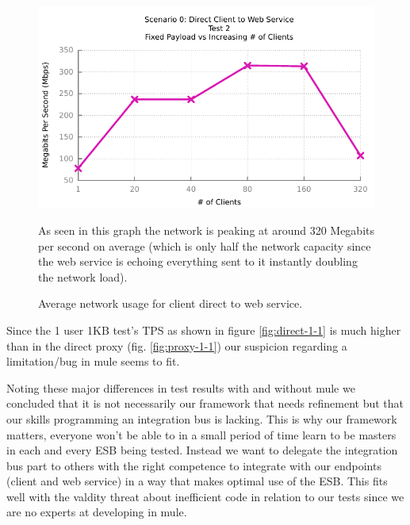 \begin{figure}
	\caption{Average network usage for client direct to web service.}
	\centerline{\includegraphics{img/direct_fp_iu_kbs}}
	\label{fig:direct-2-3}
	As seen in this graph the network is peaking at around 320 Megabits per second on average (which is only half the network capacity since the web service is echoing everything sent to it instantly doubling the network load).
\end{figure}

Since the 1 user 1KB test's TPS as shown in figure \ref{fig:direct-1-1} is much higher than in the direct proxy (fig. \ref{fig:proxy-1-1}) our suspicion regarding a limitation/bug in mule seems to fit.

Noting these major differences in test results with and without mule we concluded that it is not necessarily our framework that needs refinement but that our skills programming an integration bus is lacking. This is why our framework matters, everyone won't be able to in a small period of time learn to be masters in each and every ESB being tested. Instead we want to delegate the integration bus part to others with the right competence to integrate with our endpoints (client and web service) in a way that makes optimal use of the ESB. This fits well with the valdity threat about inefficient code in relation to our tests since we are no experts at developing in mule.
